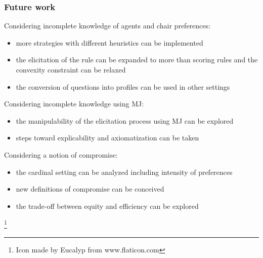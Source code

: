 \documentclass[aspectratio=169]{beamer}
\begin{document}
\begin{frame}
	\frametitle{Future work}
	\vspace{-0.5em}
	\begin{block}{Considering incomplete knowledge of agents and chair preferences:}
		\begin{itemize}
			\item more strategies with different heuristics can be implemented
			\item the elicitation of the rule can be expanded to more than scoring rules and the convexity constraint can be relaxed
			\item the conversion of questions into profiles can be used in other settings
		\end{itemize}	
	\end{block}
	\begin{block}{Considering incomplete knowledge using MJ:}
		\begin{itemize}
			\item the manipulability of the elicitation process using MJ can be explored
			\item steps toward explicability and axiomatization can be taken
		\end{itemize}
	\end{block}
	
	\begin{block}{Considering a notion of compromise:}
		\begin{itemize}
			\item the cardinal setting can be analyzed including intensity of preferences
			\item new definitions of compromise can be conceived
			\item the trade-off between equity and efficiency can be explored
		\end{itemize}
	\end{block}
\end{frame}

\addtocounter{framenumber}{-1}
\begin{frame}[plain]
	{\let\thefootnote\relax\footnote{\tiny Icon made by Eucalyp from www.flaticon.com}}
\end{frame}
\end{document}
